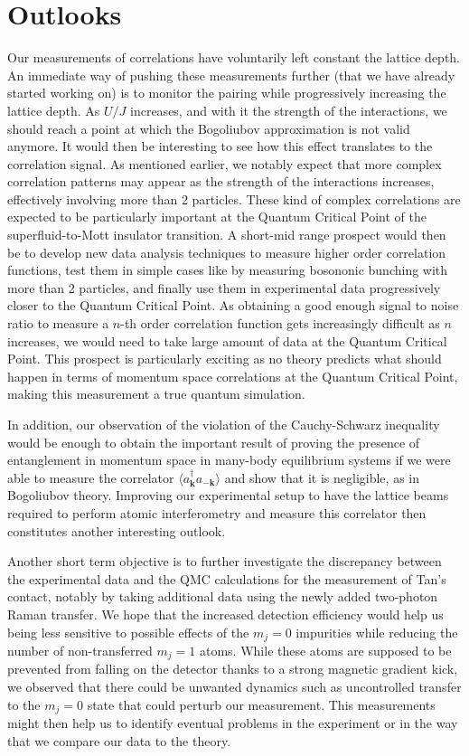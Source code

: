 \section*{Outlooks}

Our measurements of \kmk correlations have voluntarily left constant the lattice depth. An immediate way of pushing these measurements further (that we have already started working on) is to monitor the pairing while progressively increasing the lattice depth. As $U/J$ increases, and with it the strength of the interactions, we should reach a point at which the Bogoliubov approximation is not valid anymore. It would then be interesting to see how this effect translates to the \kmk correlation signal. As mentioned earlier, we notably expect that more complex correlation patterns may appear as the strength of the interactions increases, effectively involving more than 2 particles. These kind of complex correlations are expected to be particularly important at the Quantum Critical Point of the superfluid-to-Mott insulator transition. A short-mid range prospect would then be to develop new data analysis techniques to measure higher order correlation functions, test them in simple cases like by measuring bosononic bunching with more than 2 particles, and finally use them in experimental data progressively closer to the Quantum Critical Point. As obtaining a good enough signal to noise ratio to measure a $n$-th order correlation function gets increasingly difficult as $n$ increases, we would need to take large amount of data at the Quantum Critical Point. This prospect is particularly exciting as no theory predicts what should happen in terms of momentum space correlations at the Quantum Critical Point, making this measurement a true quantum simulation. 

In addition, our observation of the violation of the Cauchy-Schwarz inequality would be enough to obtain the important result of proving the presence of entanglement in momentum space in many-body equilibrium systems if we were able to measure the correlator  $\langle a^{\dagger}_{\bm k} a_{-\bm k} \rangle$ and show that it is negligible, as in Bogoliubov theory. Improving our experimental setup to have the lattice beams required to perform atomic interferometry and measure this correlator then constitutes another interesting outlook.

Another short term objective is to further investigate the discrepancy between the experimental data and the QMC calculations for the measurement of Tan's contact, notably by taking additional data using the newly added two-photon Raman transfer. We hope that the increased detection efficiency would help us being less sensitive to possible effects of the $m_j=0$ impurities while reducing the number of non-transferred $m_j=1$ atoms. While these atoms are supposed to be prevented from falling on the detector thanks to a strong magnetic gradient kick, we observed that there could be unwanted dynamics such as uncontrolled transfer to the $m_j=0$ state that could perturb our measurement. This measurements might then help us to identify eventual problems in the experiment or in the way that we compare our data to the theory.

